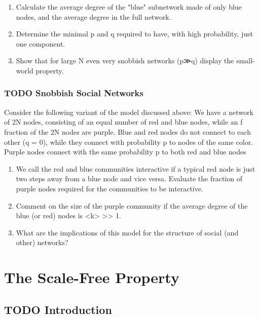 \documentclass[11pt]{article}
\begin{document}
\begin{enumerate}
\item Calculate the average degree of the "blue" subnetwork made of only blue nodes, and the average degree in the full network.
\item Determine the minimal p and q required to have, with high probability, just one component.
\item Show that for large N even very snobbish networks (p≫q) display the small-world property.
\end{enumerate}

\subsubsection{{\bfseries\sffamily TODO} Snobbish Social Networks}
\label{sec:orgb42a490}
Consider the following variant of the model discussed above: We have a network of 2N nodes, consisting of an equal number of red and blue nodes, while an f fraction of the 2N nodes are purple. Blue and red nodes do not connect to each other (q = 0), while they connect with probability p to nodes of the same color. Purple nodes connect with the same probability p to both red and blue nodes

\begin{enumerate}
\item We call the red and blue communities interactive if a typical red node is just two steps away from a blue node and vice versa. Evaluate the fraction of purple nodes required for the communities to be interactive.
\item Comment on the size of the purple community if the average degree of the blue (or red) nodes is <k> >> 1.
\item What are the implications of this model for the structure of social (and other) networks?
\end{enumerate}

\section{The Scale-Free Property}
\label{sec:orgca28ef9}

\subsection{{\bfseries\sffamily TODO} Introduction}
\label{sec:org7b8934e}
\end{document}
